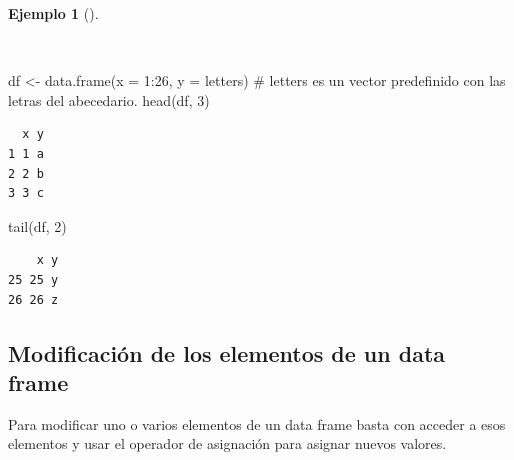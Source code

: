 \documentclass[
  spanish,
  a4paper,
]{scrreport}
\newenvironment{Shaded}{\begin{snugshade}}{\end{snugshade}}
\newcommand{\AttributeTok}[1]{\textcolor[rgb]{0.40,0.45,0.13}{#1}}
\newcommand{\CommentTok}[1]{\textcolor[rgb]{0.37,0.37,0.37}{#1}}
\newcommand{\DecValTok}[1]{\textcolor[rgb]{0.68,0.00,0.00}{#1}}
\newcommand{\FunctionTok}[1]{\textcolor[rgb]{0.28,0.35,0.67}{#1}}
\newcommand{\NormalTok}[1]{\textcolor[rgb]{0.00,0.23,0.31}{#1}}
\newcommand{\OtherTok}[1]{\textcolor[rgb]{0.00,0.23,0.31}{#1}}
\newcommand{\SpecialCharTok}[1]{\textcolor[rgb]{0.37,0.37,0.37}{#1}}
\theoremstyle{definition}
\theoremstyle{definition}
\newtheorem{example}{Ejemplo}[chapter]
\theoremstyle{remark}
\begin{document}
\begin{example}[]\protect\hypertarget{exm-acceso-primeras-ultimas-filas-data-frame}{}\label{exm-acceso-primeras-ultimas-filas-data-frame}

~

\begin{Shaded}
\begin{Highlighting}[]
\NormalTok{df }\OtherTok{\textless{}{-}} \FunctionTok{data.frame}\NormalTok{(}\AttributeTok{x =} \DecValTok{1}\SpecialCharTok{:}\DecValTok{26}\NormalTok{, }\AttributeTok{y =}\NormalTok{ letters) }\CommentTok{\# letters es un vector predefinido con las letras del abecedario.}
\FunctionTok{head}\NormalTok{(df, }\DecValTok{3}\NormalTok{)}
\end{Highlighting}
\end{Shaded}

\begin{verbatim}
  x y
1 1 a
2 2 b
3 3 c
\end{verbatim}

\begin{Shaded}
\begin{Highlighting}[]
\FunctionTok{tail}\NormalTok{(df, }\DecValTok{2}\NormalTok{)}
\end{Highlighting}
\end{Shaded}

\begin{verbatim}
    x y
25 25 y
26 26 z
\end{verbatim}

\end{example}

\subsection{Modificación de los elementos de un data
frame}\label{modificaciuxf3n-de-los-elementos-de-un-data-frame}

Para modificar uno o varios elementos de un data frame basta con acceder
a esos elementos y usar el operador de asignación para asignar nuevos
valores.
\end{document}
